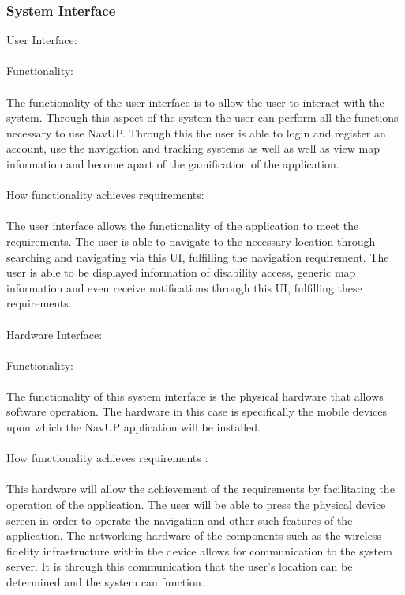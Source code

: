 \documentclass{article}
\begin{document}
        	\subsubsection{System Interface}{
User Interface:
\\\\
Functionality:
\\\\
The functionality of the user interface is to allow the user to interact with the system. Through this aspect of the system the user can perform all the functions necessary to use NavUP. Through this the user is able to login and register an account, use the navigation and tracking systems as well as well as view map information and become apart of the gamification of the application.
\\\\
How functionality achieves requirements:
\\\\
The user interface allows the functionality of the application to meet the requirements. The user is able to navigate to the necessary location through searching and navigating via this UI, fulfilling the navigation requirement. The user is able to be displayed information of disability access, generic map information and even receive notifications through this UI, fulfilling these requirements. 
\\\\
Hardware Interface:
\\\\
Functionality:
\\\\
The functionality of this system interface is the physical hardware that allows software operation. The hardware in this case is specifically the mobile devices upon which the NavUP application will be installed.
\\\\
How functionality achieves requirements :
\\\\
This hardware will allow the achievement of the requirements by facilitating the operation of the application. The user will be able to press the physical device screen in order to operate the navigation and other such features of the application. The networking hardware of the components such as the wireless fidelity infrastructure within the device allows for communication to the system server. It is through this communication that the user's location can be determined and the system can function.
}
\end{document}
